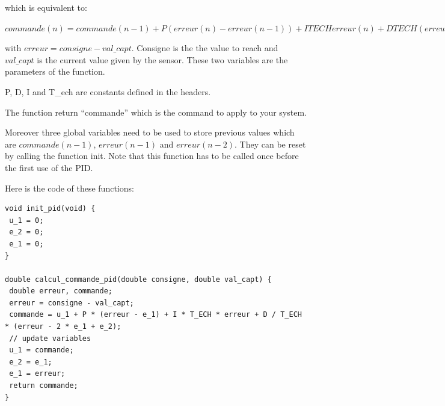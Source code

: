 which is equivalent to:

$commande(n) =commande(n-1)+P(erreur(n)-erreur(n-1))+ITECHerreur(n)+DTECH(erreur(n)-2*erreur(n-1)+erreur(n-2))$


with $erreur = consigne - val\_capt$. Consigne is the the value to reach and $val\_capt$ is the current value given by the sensor. These two variables are the parameters of the function.

P, D, I and T\_ech are constants defined in the headers.

The function return ``commande'' which is the command to apply to your system.

Moreover three global variables need to be used to store previous values which are $commande(n-1)$, $erreur(n-1)$ and $erreur(n-2)$. They can be reset by calling the function init. Note that this function has to be called once before the first use of the PID.

Here is the code of these functions:
\begin{lstlisting}
void init_pid(void) {
 u_1 = 0;
 e_2 = 0;
 e_1 = 0;
}

double calcul_commande_pid(double consigne, double val_capt) {
 double erreur, commande;
 erreur = consigne - val_capt;
 commande = u_1 + P * (erreur - e_1) + I * T_ECH * erreur + D / T_ECH * (erreur - 2 * e_1 + e_2);
 // update variables
 u_1 = commande;
 e_2 = e_1;
 e_1 = erreur;
 return commande;
}
\end{lstlisting}
